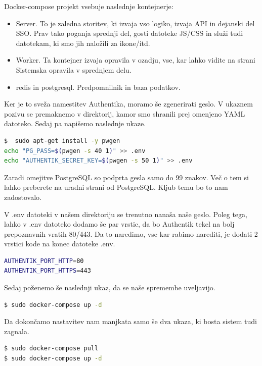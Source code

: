 \documentclass[a4paper,12pt,openright]{book}
\begin{document}
{Docker-compose projekt vsebuje naslednje kontejnerje:

\begin{itemize}
    \item Server. To je zaledna storitev, ki izvaja vso logiko, izvaja API in dejanski del SSO. Prav tako poganja sprednji del, gosti datoteke JS/CSS in služi tudi datotekam, ki smo jih naložili za ikone/itd.
    \item Worker. Ta kontejner izvaja opravila v ozadju, vse, kar lahko vidite na strani Sistemska opravila v sprednjem delu.
    \item redis in postgresql. Predpomnilnik in baza podatkov.
\end{itemize}

Ker je to sveža namestitev Authentika, moramo še zgenerirati geslo. V ukaznem pozivu se premaknemo v direktorij, kamor smo shranili prej omenjeno YAML datoteko. Sedaj pa napišemo naslednje ukaze.

\begin{lstlisting}[language=bash]
$  sudo apt-get install -y pwgen
echo "PG_PASS=$(pwgen -s 40 1)" >> .env
echo "AUTHENTIK_SECRET_KEY=$(pwgen -s 50 1)" >> .env
\end{lstlisting}

Zaradi omejitve PostgreSQL so podprta gesla samo do 99 znakov. Več o tem si lahko preberete na uradni strani od PostgreSQL\cite{PostgreSQL}. Kljub temu bo to nam zadostovalo. \newline

V .env datoteki v našem direktoriju se trenutno nanaša naše geslo. Poleg tega, lahko v .env datoteko dodamo še par vrstic, da bo Authentik tekel na bolj prepoznavnih vratih 80/443. Da to naredimo, vse kar rabimo narediti, je dodati 2 vrstici kode na konec datoteke .env.

\begin{lstlisting}[language=bash]
AUTHENTIK_PORT_HTTP=80
AUTHENTIK_PORT_HTTPS=443
\end{lstlisting}

Sedaj poženemo še naslednji ukaz, da se naše spremembe uveljavijo. 

\begin{lstlisting}[language=bash]
$ sudo docker-compose up -d
\end{lstlisting}

Da dokončamo nastavitev nam manjkata samo še dva ukaza, ki bosta sistem tudi zagnala.

\begin{lstlisting}[language=bash]
$ sudo docker-compose pull
$ sudo docker-compose up -d
\end{lstlisting}

}
\end{document}
